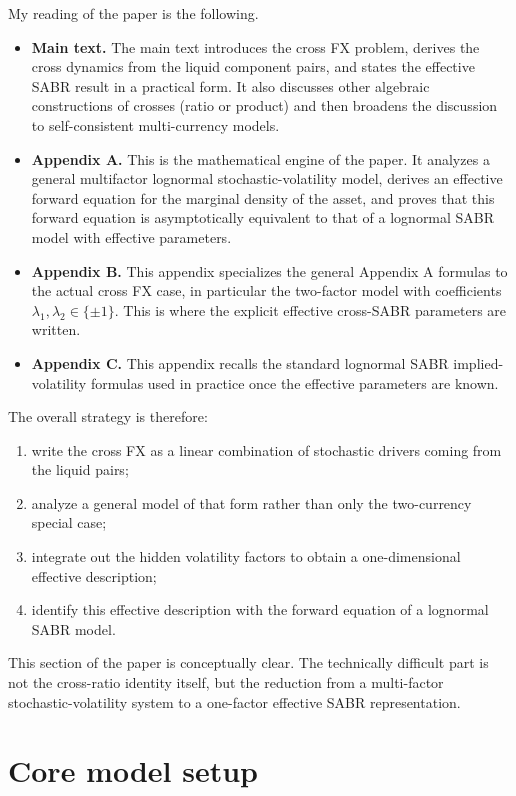 \documentclass[11pt]{article}
\begin{document}
My reading of the paper is the following.

\begin{itemize}
    \item \textbf{Main text.} The main text introduces the cross FX problem, derives the cross dynamics from the liquid component pairs, and states the effective SABR result in a practical form. It also discusses other algebraic constructions of crosses (ratio or product) and then broadens the discussion to self-consistent multi-currency models.
    \item \textbf{Appendix A.} This is the mathematical engine of the paper. It analyzes a general multifactor lognormal stochastic-volatility model, derives an effective forward equation for the marginal density of the asset, and proves that this forward equation is asymptotically equivalent to that of a lognormal SABR model with effective parameters.
    \item \textbf{Appendix B.} This appendix specializes the general Appendix A formulas to the actual cross FX case, in particular the two-factor model with coefficients \(\lambda_1,\lambda_2\in\{\pm1\}\). This is where the explicit effective cross-SABR parameters are written.
    \item \textbf{Appendix C.} This appendix recalls the standard lognormal SABR implied-volatility formulas used in practice once the effective parameters are known.
\end{itemize}

The overall strategy is therefore:
\begin{enumerate}
    \item write the cross FX as a linear combination of stochastic drivers coming from the liquid pairs;
    \item analyze a general model of that form rather than only the two-currency special case;
    \item integrate out the hidden volatility factors to obtain a one-dimensional effective description;
    \item identify this effective description with the forward equation of a lognormal SABR model.
\end{enumerate}

This section of the paper is conceptually clear. The technically difficult part is not the cross-ratio identity itself, but the reduction from a multi-factor stochastic-volatility system to a one-factor effective SABR representation.

\section{Core model setup}
\end{document}
